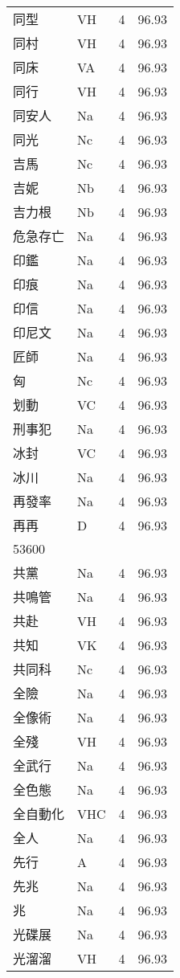 \documentclass[twocolumn]{book}
\begin{document}
\begin{supertabular}{llrr}
同型 & VH & 4 &  96.93\\
同村 & VH & 4 &  96.93\\
同床 & VA & 4 &  96.93\\
同行 & VH & 4 &  96.93\\
同安人 & Na & 4 &  96.93\\
同光 & Nc & 4 &  96.93\\
吉馬 & Nc & 4 &  96.93\\
吉妮 & Nb & 4 &  96.93\\
吉力根 & Nb & 4 &  96.93\\
危急存亡 & Na & 4 &  96.93\\
印鑑 & Na & 4 &  96.93\\
印痕 & Na & 4 &  96.93\\
印信 & Na & 4 &  96.93\\
印尼文 & Na & 4 &  96.93\\
匠師 & Na & 4 &  96.93\\
匈 & Nc & 4 &  96.93\\
划動 & VC & 4 &  96.93\\
刑事犯 & Na & 4 &  96.93\\
冰封 & VC & 4 &  96.93\\
冰川 & Na & 4 &  96.93\\
再發率 & Na & 4 &  96.93\\
再再 & D & 4 &  96.93\\
53600\\
共黨 & Na & 4 &  96.93\\
共鳴管 & Na & 4 &  96.93\\
共赴 & VH & 4 &  96.93\\
共知 & VK & 4 &  96.93\\
共同科 & Nc & 4 &  96.93\\
全險 & Na & 4 &  96.93\\
全像術 & Na & 4 &  96.93\\
全殘 & VH & 4 &  96.93\\
全武行 & Na & 4 &  96.93\\
全色態 & Na & 4 &  96.93\\
全自動化 & VHC & 4 &  96.93\\
全人 & Na & 4 &  96.93\\
先行 & A & 4 &  96.93\\
先兆 & Na & 4 &  96.93\\
兆 & Na & 4 &  96.93\\
光碟展 & Na & 4 &  96.93\\
光溜溜 & VH & 4 &  96.93\\

\end{supertabular}
\end{document}
